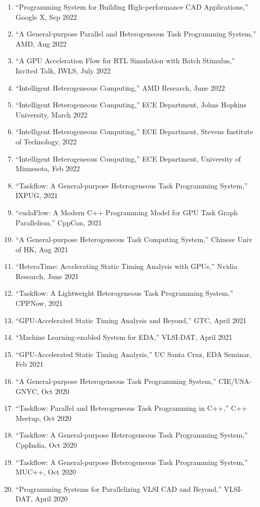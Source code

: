 \documentclass[A4,11pt]{article}
\begin{document}
\begin{enumerate}
  \item ``Programming System for Building High-performance CAD Applications,'' Google X, Sep 2022
  \item ``A General-purpose Parallel and Heterogeneous Task Programming System,'' AMD, Aug 2022
  \item ``A GPU Acceleration Flow for RTL Simulation with Batch Stimulus,'' Invited Talk, IWLS, July 2022
  \item ``Intelligent Heterogeneous Computing,'' AMD Research, June 2022
  \item ``Intelligent Heterogeneous Computing,'' ECE Department, Johns Hopkins University, March 2022
  \item ``Intelligent Heterogeneous Computing,'' ECE Department, Stevens Institute of Technology, 2022
  \item ``Intelligent Heterogeneous Computing,'' ECE Department, University of Minnesota, Feb 2022
  \item ``Taskflow: A General-purpose Heterogeneous Task Programming System,'' IXPUG, 2021
  \item ``cudaFlow: A Modern C++ Programming Model for GPU Task Graph Parallelism,'' CppCon, 2021
  \item ``A General-purpose Heterogeneous Task Computing System,'' Chinese Univ of HK, Aug 2021
  \item ``HeteroTime: Accelerating Static Timing Analysis with GPUs,'' Nvidia Research, June 2021
  \item ``Taskflow: A Lightweight Heterogeneous Task Programming System,'' CPPNow, 2021
  \item ``GPU-Accelerated Static Timing Analysis and Beyond,'' GTC, April 2021
  \item ``Machine Learning-enabled System for EDA,'' VLSI-DAT, April 2021
  \item ``GPU-Accelerated Static Timing Analysis,'' UC Santa Cruz, EDA Seminar, Feb 2021 
  \item ``A General-purpose Heterogeneous Task Programming System,'' CIE/USA-GNYC, Oct 2020
  \item ``Taskflow: Parallel and Heterogeneous Task Programming in C++,'' C++ Meetup, Oct 2020
  \item ``Taskflow: A General-purpose Heterogeneous Task Programming System,'' CppIndia, Oct 2020
  \item ``Taskflow: A General-purpose Heterogeneous Task Programming System,'' MUC++, Oct 2020
  \item ``Programming Systems for Parallelizing VLSI CAD and Beyond,'' VLSI-DAT, April 2020

\end{enumerate}
\end{document}

